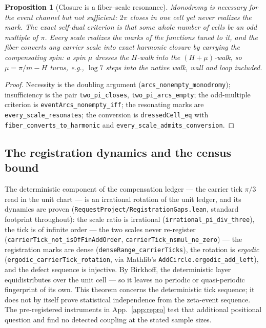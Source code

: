 \documentclass[11pt]{article}
\newtheorem{proposition}[theorem]{Proposition}
\theoremstyle{definition}
\begin{document}
\begin{proposition}[Closure is a fiber--scale resonance]\label{prop:fiber-resonance}
Monodromy is necessary for the event channel but not sufficient: \(2\pi\)
closes in one cell yet never realizes the mark.  The exact self-dual
criterion is that some whole number of cells be an odd multiple of \(\pi\).
Every scale realizes the marks of the functions tuned to it, and the fiber
converts \emph{any} carrier scale into exact harmonic closure by carrying the
compensating spin: a spin \(\mu\) dresses the \(H\)-walk into the
\((H+\mu)\)-walk, so \(\mu=\pi/m-H\) turns, e.g., \(\log 7\) steps into the
native walk, wall and loop included.
\end{proposition}

\begin{proof}
Necessity is the doubling argument (\texttt{arcs\_nonempty\_monodromy});
insufficiency is the pair \texttt{two\_pi\_closes},
\texttt{two\_pi\_arcs\_empty}; the odd-multiple criterion is
\texttt{eventArcs\_nonempty\_iff}; the resonating marks are
\texttt{every\_scale\_resonates}; the conversion is \texttt{dressedCell\_eq}
with \texttt{fiber\_converts\_to\_harmonic} and
\texttt{every\_scale\_admits\_conversion}.
\end{proof}

\subsection{The registration dynamics and the census bound}\label{sec:registration-dynamics}

The deterministic component of the compensation ledger --- the carrier tick $\pi/3$ read in the
unit chart --- is an irrational rotation of the unit ledger, and its dynamics are proven
(\texttt{RequestProject/RegistrationGaps.lean}, standard footprint throughout): the scale ratio is
irrational (\texttt{irrational\_pi\_div\_three}), the tick is of infinite order --- the two scales
never re-register (\texttt{carrierTick\_not\_isOfFinAddOrder}, \texttt{carrierTick\_nsmul\_ne\_zero})
--- the registration marks are dense (\texttt{denseRange\_carrierTicks}), the rotation is
\emph{ergodic} (\texttt{ergodic\_carrierTick\_rotation}, via Mathlib's
\texttt{AddCircle.ergodic\_add\_left}), and the defect sequence is injective.  By Birkhoff, the
deterministic layer equidistributes over the unit cell --- so it leaves no periodic or
quasi-periodic fingerprint of its own.  This theorem concerns the deterministic tick sequence;
it does not by itself prove statistical independence from the zeta-event sequence.  The
pre-registered instruments in App.~\ref{app:repro} test that additional positional question and
find no detected coupling at the stated sample sizes.
\end{document}
